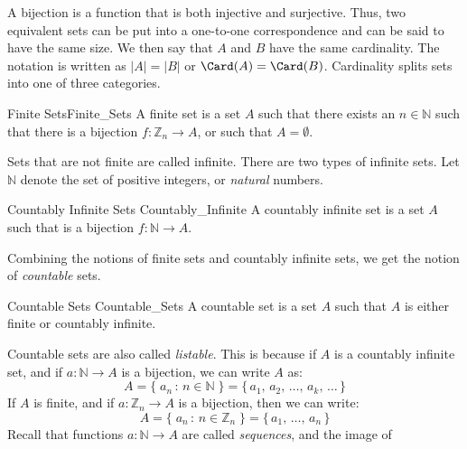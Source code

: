         A bijection is a function that is both injective and
        surjective. Thus, two equivalent sets can be put
        into a one-to-one correspondence and can be said to
        have the same size. We then say that $A$ and $B$
        have the same cardinality. The notation is written
        as $|A|=|B|$ or $\Card(A)=\Card(B)$. Cardinality
        splits sets into one of three categories.
        \begin{ldefinition}{Finite Sets}{Finite_Sets}
            A finite set is a set $A$ such that there exists
            an $n\in\mathbb{N}$ such that there is a
            bijection $f:\mathbb{Z}_{n}\rightarrow{A}$, or
            such that $A=\emptyset$.
        \end{ldefinition}
        Sets that are not finite are called infinite. There
        are two types of infinite sets. Let $\mathbb{N}$
        denote the set of positive integers, or
        \textit{natural} numbers.
        \begin{ldefinition}{Countably Infinite Sets}
              {Countably_Infinite}
            A countably infinite set is a set $A$ such that
            is a bijection $f:\mathbb{N}\rightarrow{A}$.
        \end{ldefinition}
        Combining the notions of finite sets and countably
        infinite sets, we get the notion of
        \textit{countable} sets.
        \begin{ldefinition}{Countable Sets}
              {Countable_Sets}
            A countable set is a set $A$ such that $A$ is
            either finite or countably infinite.
        \end{ldefinition}
        Countable sets are also called \textit{listable}.
        This is because if $A$ is a countably infinite set,
        and if $a:\mathbb{N}\rightarrow{A}$ is a bijection,
        we can write $A$ as:
        \begin{equation}
            A=\{\;a_{n}\,:\,n\in\mathbb{N}\;\}
            =\{\,a_{1},\,a_{2},\,\dots,\,a_{k},\,\dots\,\}
        \end{equation}
        If $A$ is finite, and if
        $a:\mathbb{Z}_{n}\rightarrow{A}$ is a
        bijection, then we can write:
        \begin{equation}
            A=\{\;a_{n}\,:\,n\in\mathbb{Z}_{n}\;\}
             =\{\,a_{1},\,\dots,\,a_{n}\,\}
        \end{equation}
        Recall that functions $a:\mathbb{N}\rightarrow{A}$
        are called \textit{sequences}, and the image of
